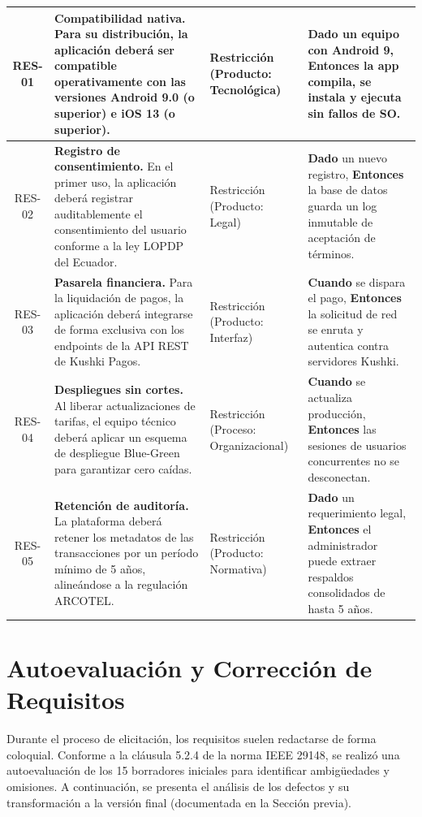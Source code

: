 \documentclass[12pt,a4paper]{article}
\begin{document}
\begin{xltabular}{\textwidth}{|c|>{\raggedright\arraybackslash}X|>{\raggedright\arraybackslash}p{3.2cm}|>{\raggedright\arraybackslash}X|}
RES-01 & \textbf{Compatibilidad nativa.} Para su distribución, la aplicación deberá ser compatible operativamente con las versiones Android 9.0 (o superior) e iOS 13 (o superior). & Restricción (Producto: Tecnológica) & \textbf{Dado} un equipo con Android 9, \textbf{Entonces} la app compila, se instala y ejecuta sin fallos de SO. \\ \hline

RES-02 & \textbf{Registro de consentimiento.} En el primer uso, la aplicación deberá registrar auditablemente el consentimiento del usuario conforme a la ley LOPDP del Ecuador. & Restricción (Producto: Legal) & \textbf{Dado} un nuevo registro, \textbf{Entonces} la base de datos guarda un log inmutable de aceptación de términos. \\ \hline

RES-03 & \textbf{Pasarela financiera.} Para la liquidación de pagos, la aplicación deberá integrarse de forma exclusiva con los endpoints de la API REST de Kushki Pagos. & Restricción (Producto: Interfaz) & \textbf{Cuando} se dispara el pago, \textbf{Entonces} la solicitud de red se enruta y autentica contra servidores Kushki. \\ \hline

RES-04 & \textbf{Despliegues sin cortes.} Al liberar actualizaciones de tarifas, el equipo técnico deberá aplicar un esquema de despliegue Blue-Green para garantizar cero caídas. & Restricción (Proceso: Organizacional) & \textbf{Cuando} se actualiza producción, \textbf{Entonces} las sesiones de usuarios concurrentes no se desconectan. \\ \hline

RES-05 & \textbf{Retención de auditoría.} La plataforma deberá retener los metadatos de las transacciones por un período mínimo de 5 años, alineándose a la regulación ARCOTEL. & Restricción (Producto: Normativa) & \textbf{Dado} un requerimiento legal, \textbf{Entonces} el administrador puede extraer respaldos consolidados de hasta 5 años. \\ \hline

\end{xltabular}

\section{Autoevaluación y Corrección de Requisitos}
Durante el proceso de elicitación, los requisitos suelen redactarse de forma coloquial. Conforme a la cláusula 5.2.4 de la norma IEEE 29148, se realizó una autoevaluación de los 15 borradores iniciales para identificar ambigüedades y omisiones. A continuación, se presenta el análisis de los defectos y su transformación a la versión final (documentada en la Sección previa).
\end{document}
